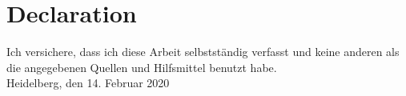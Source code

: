 
\thispagestyle{NoHeader}

\section*{Declaration}

Ich versichere, dass ich diese Arbeit selbstst\"{a}ndig verfasst und keine
anderen als die angegebenen Quellen und Hilfsmittel benutzt habe.
\\

Heidelberg, den 14. Februar 2020


